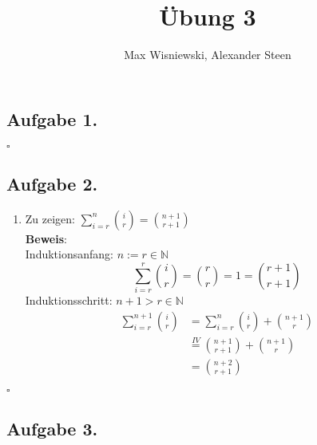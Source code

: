 \documentclass[11pt,a4paper,ngerman]{article}
\date{}
\title{Übung 3}
\author{Max Wisniewski, Alexander Steen}
\begin{document}

\renewcommand{\figurename}{Figure}

\maketitle
\thispagestyle{fancy}

\subsection*{Aufgabe 1.}
\mbox{}\hfill$\square$

\subsection*{Aufgabe 2.}
\begin{enumerate}
  \item Zu zeigen: $\sum_{i=r}^{n}{\binom{i}{r}} = \binom{n+1}{r+1}$ \\
        \textbf{Beweis}:\\
        Induktionsanfang: $n := r \in \mathbb{N}$
        \begin{equation*}
          \sum_{i=r}^{r}{\binom{i}{r}} = \binom{r}{r} = 1 = \binom{r+1}{r+1}
        \end{equation*}
        Induktionsschritt: $n+1 > r \in \mathbb{N}$
        \begin{equation*}\begin{split}
          \sum_{i=r}^{n+1}{\binom{i}{r}} &= \sum_{i=r}^{n}{\binom{i}{r}} + \binom{n+1}{r} \\
          &\stackrel{IV}{=} \binom{n+1}{r+1} + \binom{n+1}{r}\\
          &= \binom{n+2}{r+1}
        \end{split}\end{equation*}
\end{enumerate}
\mbox{}\hfill$\square$

\subsection*{Aufgabe 3.}
\label{LastPage}
\end{document}
